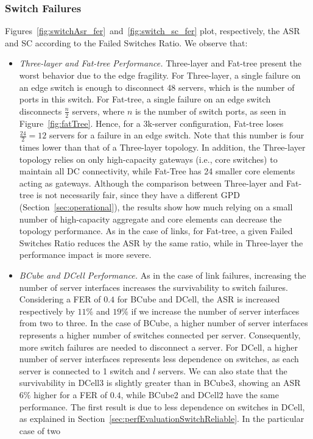 \subsubsection{Switch Failures}
\label{sec:perfEvaluationSwitchSurvival}

Figures~\ref{fig:switchAsr_fer}~and~\ref{fig:switch_sc_fer} plot, respectively, the ASR and SC according to the Failed Switches Ratio. We observe that:
\begin{itemize}
\item \textit{Three-layer and Fat-tree Performance.} Three-layer and Fat-tree present the worst behavior due to the edge fragility. For Three-layer, a single failure on an edge switch is enough to disconnect 48 servers, which is the number of ports in this switch. For Fat-tree, a single failure on an edge switch disconnects $\frac{n}{2}$ servers, where $n$ is the number of switch ports, as seen in Figure~\ref{fig:fatTree}. Hence, for a 3k-server configuration, Fat-tree loses $\frac{24}{2}=12$ servers for a failure in an edge switch. Note that this number is four times lower than that of a Three-layer topology.
In addition, the Three-layer topology relies on only high-capacity gateways (i.e., core switches) to maintain all DC connectivity, while Fat-Tree has 24 smaller core elements acting as gateways. Although the comparison between Three-layer and Fat-tree is not necessarily fair, since they have a different GPD (Section~\ref{sec:operational}), the results show how much relying on a small number of high-capacity aggregate and core elements can decrease the topology performance.
As in the case of links, for Fat-tree, a given Failed Switches Ratio reduces the ASR by the same ratio, while in Three-layer the performance impact is more severe.
\item \textit{BCube and DCell Performance.} As in the case of link failures, increasing the number of server interfaces increases the survivability to switch failures. Considering a FER of $0.4$ for BCube and DCell, the ASR is increased respectively by $11\%$ and $19\%$ if we increase the number of server interfaces from two to three. In the case of BCube, a higher number of server interfaces represents a higher number of switches connected per server. Consequently, more switch failures are needed to disconnect a server. For DCell, a higher number of server interfaces represents less dependence on switches, as each server is connected to 1 switch and $l$ servers. We can also state that the survivability in DCell3 is slightly greater than in BCube3, showing an ASR $6\%$ higher for a FER of $0.4$, while BCube2 and DCell2 have the same performance. The first result is due to less dependence on switches in DCell, as explained in Section~\ref{sec:perfEvaluationSwitchReliable}. In the particular case of two 

\end{itemize}

